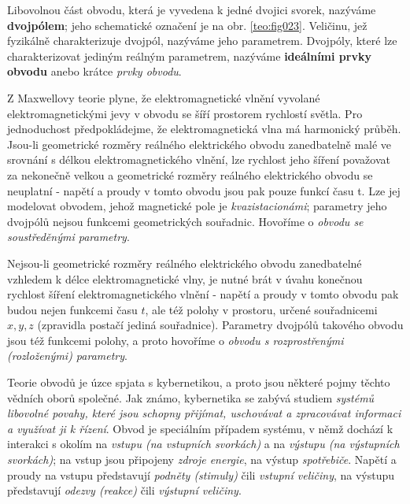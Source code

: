       Libovolnou část obvodu, která je vyvedena k jedné dvojici svorek, nazýváme 
      \textbf{dvojpólem}; jeho schematické označení je na obr. \ref{teo:fig023}. Veličinu, jež 
      fyzikálně charakterizuje dvojpól, nazýváme jeho parametrem. Dvojpóly, které lze 
      charakterizovat jediným reálným parametrem, nazýváme \textbf{ideálními prvky obvodu} anebo 
      krátce \emph{prvky obvodu}.
      
      Z Maxwellovy teorie plyne, že elektromagnetické vlnění vyvolané elektromagnetickými jevy v 
      obvodu se šíří prostorem rychlostí světla. Pro jednoduchost předpokládejme, že 
      elektromagnetická vlna má harmonický průběh. Jsou-li geometrické rozměry reálného 
      elektrického obvodu zanedbatelně malé ve srovnání s délkou elektromagnetického vlnění, lze 
      rychlost jeho šíření považovat za nekonečně velkou a geometrické rozměry reálného 
      elektrického obvodu se neuplatní - napětí a proudy v tomto obvodu jsou pak pouze funkcí času 
      t. Lze jej modelovat obvodem, jehož magnetické pole je \emph{kvazistacionámi}; parametry jeho 
      dvojpólů nejsou funkcemi geometrických souřadnic. Hovoříme o \emph{obvodu se soustředěnými 
      parametry}.
      
      Nejsou-li geometrické rozměry reálného elektrického obvodu zanedbatelné vzhledem k délce 
      elektromagnetické vlny, je nutné brát v úvahu konečnou rychlost šíření elektromagnetického 
      vlnění - napětí a proudy v tomto obvodu pak budou nejen funkcemi času \(t\), ale též polohy v 
      prostoru, určené souřadnicemi \(x, y, z\) (zpravidla postačí jediná souřadnice). Parametry 
      dvojpólů takového obvodu jsou též funkcemi polohy, a proto hovoříme o \emph{obvodu s 
      rozprostřenými (rozloženými) parametry}.
            
      Teorie obvodů je úzce spjata s kybernetikou, a proto jsou některé pojmy těchto vědních oborů 
      společné. Jak známo, kybernetika se zabývá studiem \emph{systémů libovolné povahy, které jsou 
      schopny přijímat, uschovávat a zpracovávat informaci a využívat ji k řízení}. Obvod je 
      speciálním případem systému, v němž dochází k interakci s okolím na \emph{vstupu (na 
      vstupních svorkách)} a na \emph{výstupu (na výstupních svorkách)}; na vstup jsou připojeny 
      \emph{zdroje energie}, na výstup \emph{spotřebiče}. Napětí a proudy na vstupu představují 
      \emph{podněty (stimuly)} čili \emph{vstupní veličiny}, na výstupu představují \emph{odezvy 
      (reakce)} čili \emph{výstupní veličiny}.
      

